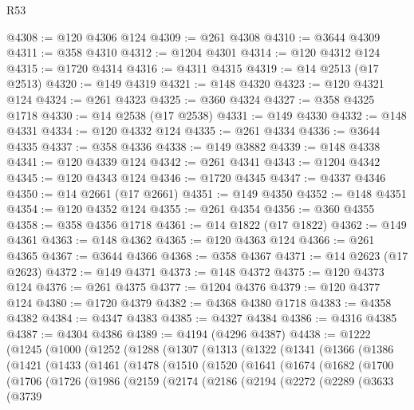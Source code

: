 \begin{lexlean}{R53}
\begin{coremodule}
@4308 := @120 @4306 @124
@4309 := @261 @4308
@4310 := @3644 @4309
@4311 := @358 @4310
@4312 := @1204 @4301
@4314 := @120 @4312 @124
@4315 := @1720 @4314
@4316 := @4311 @4315
@4319 := @14 @2513 (@17 @2513)
@4320 := @149 @4319
@4321 := @148 @4320
@4323 := @120 @4321 @124
@4324 := @261 @4323
@4325 := @360 @4324
@4327 := @358 @4325 @1718
@4330 := @14 @2538 (@17 @2538)
@4331 := @149 @4330
@4332 := @148 @4331
@4334 := @120 @4332 @124
@4335 := @261 @4334
@4336 := @3644 @4335
@4337 := @358 @4336
@4338 := @149 @3882
@4339 := @148 @4338
@4341 := @120 @4339 @124
@4342 := @261 @4341
@4343 := @1204 @4342
@4345 := @120 @4343 @124
@4346 := @1720 @4345
@4347 := @4337 @4346
@4350 := @14 @2661 (@17 @2661)
@4351 := @149 @4350
@4352 := @148 @4351
@4354 := @120 @4352 @124
@4355 := @261 @4354
@4356 := @360 @4355
@4358 := @358 @4356 @1718
@4361 := @14 @1822 (@17 @1822)
@4362 := @149 @4361
@4363 := @148 @4362
@4365 := @120 @4363 @124
@4366 := @261 @4365
@4367 := @3644 @4366
@4368 := @358 @4367
@4371 := @14 @2623 (@17 @2623)
@4372 := @149 @4371
@4373 := @148 @4372
@4375 := @120 @4373 @124
@4376 := @261 @4375
@4377 := @1204 @4376
@4379 := @120 @4377 @124
@4380 := @1720 @4379
@4382 := @4368 @4380 @1718
@4383 := @4358 @4382
@4384 := @4347 @4383
@4385 := @4327 @4384
@4386 := @4316 @4385
@4387 := @4304 @4386
@4389 := @4194 (@4296 @4387)
@4438 := @1222
    (@1245
      (@1000
        (@1252
          (@1288
            (@1307
              (@1313
                (@1322
                  (@1341
                    (@1366
                      (@1386
                        (@1421
                          (@1433
                            (@1461
                              (@1478
                                (@1510
                                  (@1520
                                    (@1641
                                      (@1674
                                        (@1682
                                          (@1700
                                            (@1706
                                              (@1726
                                                (@1986
                                                  (@2159
                                                    (@2174
                                                      (@2186
                                                        (@2194
                                                          (@2272
                                                            (@2289
                                                              (@3633
                                                                (@3739

\end{coremodule}
\end{lexlean}
